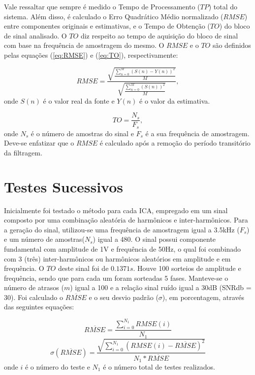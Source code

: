 \documentclass[a4paper,12pt]{monografia}
\theoremstyle{plain}
\theoremstyle{definition}
\theoremstyle{remark}
\begin{document}
Vale ressaltar que sempre é medido o Tempo de Processamento ($TP$) total do sistema. Além disso, é calculado o Erro Quadrático Médio normalizado ($RMSE$) entre componentes originais e estimativas, e o Tempo de Obtenção ($TO$) do bloco de sinal analisado. O $TO$ diz respeito ao tempo de aquisição do bloco de sinal com base na frequência de amostragem do mesmo. O $RMSE$ e o $TO$ são definidos pelas equações (\ref{eq:RMSE}) e (\ref{eq:TO}), respectivamente:

\begin{equation}
    RMSE = \frac{\sqrt{\frac{\sum_{n=0}^{M} (S(n)-Y(n))^2}{M}}}{\sqrt{\frac{\sum_{n=0}^{M} (S(n))^2}{M}}},
    \label{eq:RMSE}
\end{equation}
onde ${S}(n)$ é o valor real da fonte e ${Y}(n)$ é o valor da estimativa.

\begin{equation}
    TO = \frac{N_s}{F_s},
    \label{eq:TO}
\end{equation}
onde $N_s$ é o número de amostras do sinal e $F_s$ é a sua frequência de amostragem. Deve-se enfatizar que o $RMSE$ é calculado após a remoção do período transitório da filtragem.

\section{Testes Sucessivos}
\label{ch:testesus}

Inicialmente foi testado o método para cada ICA, empregado em um sinal composto por uma combinação aleatória de harmônicos e inter-harmônicos. Para a geração do sinal, utilizou-se uma frequência de amostragem igual a 3.5kHz ($F_s$) e um número de amostras($N_s$) igual a 480. O sinal possui componente fundamental com amplitude de 1V e frequência de 50Hz, o qual foi combinado com 3 (três) inter-harmônicos ou harmônicos aleatórios em amplitude e em frequência. O $TO$ deste sinal foi de $0.1371s$. Houve 100 sorteios de amplitude e frequência, sendo que para cada um foram sorteadas 5 fases. Manteve-se o número de atrasos ($m$) igual a 100 e a relação sinal ruído igual a 30dB (SNRdb = 30). Foi calculado o $\overline{RMSE}$ e o seu desvio padrão ($\sigma$), em porcentagem, através das seguintes equações:

\begin{equation}
    \overline{RMSE} = \frac {\sum_{i=0}^{N_1} RMSE(i) }{N_1}
    \label{eq:RMSEmedio}
\end{equation}
\begin{equation}
    \sigma(\overline{RMSE}) = \frac{\sqrt{\sum_{i=0}^{N_1} (RMSE(i)-\overline{RMSE})^2}}{N_1*\overline{RMSE}} 
    \label{eq:RMSEdesvio}
\end{equation}
onde $i$ é o número do teste e $N_1$ é o número total de testes realizados.
\end{document}

